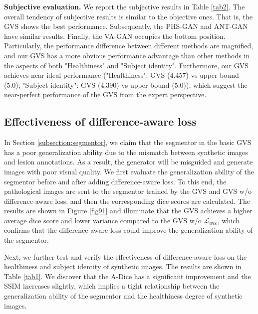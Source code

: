 \documentclass[journal,twoside,web]{ieeecolor}
\begin{document}
\noindent\textbf{Subjective evaluation.} We report the subjective results in Table \ref{tab2}. The overall tendency of subjective results is similar to the objective ones. That is, the GVS shows the best performance. Subsequently, the PHS-GAN and ANT-GAN have similar results. Finally, the VA-GAN occupies the bottom position. Particularly, the performance difference between different methods are magnified, and our GVS has a more obvious performance advantage than other methods in the aspects of both "Healthiness" and "Subject identity". Furthermore, our GVS achieves near-ideal performance ("Healthiness": GVS (4.457) vs upper bound (5.0); "Subject identity": GVS (4.390) vs upper bound (5.0)), which suggest the near-perfect performance of the GVS from the expert perspective.



\subsection{Effectiveness of difference-aware loss} \label{sec56}
In Section \ref{subsection:segmentor}, we claim that the segmentor in the basic GVS has a poor generalization ability due to the mismatch between synthetic images and lesion annotations. As a result, the generator will be misguided and generate images with poor visual quality. We first evaluate the generalization ability of the segmentor before and after adding difference-aware loss. To this end, the pathological images are sent to the segmentor trained by the GVS and GVS w/o difference-aware loss, and then the corresponding dice scores are calculated. The results are shown in Figure \ref{fig91} and illuminate that the GVS achieves a higher average dice score and lower variance compared to the GVS w/o $\mathcal{L}_{wce}$, which confirms that the difference-aware loss could improve the generalization ability of the segmentor. 

Next, we further test and verify the effectiveness of difference-aware loss on the healthiness and subject identity of synthetic images. The results are shown in Table \ref{tab1}. We discover that the A-Dice has a significant improvement and the SSIM increases slightly, which implies a tight relationship between the generalization ability of the segmentor and the healthiness degree of synthetic images. 

\end{document}
